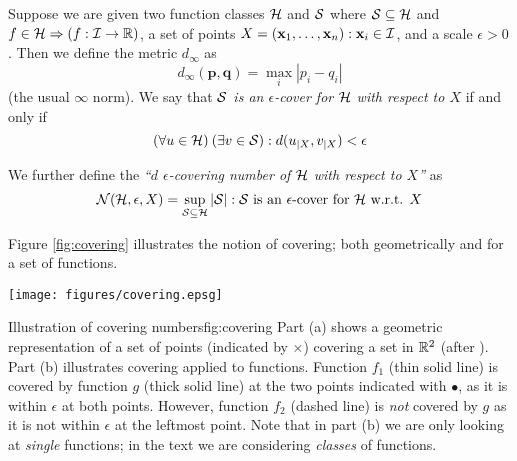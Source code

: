 \begin{definition}
\label{def:covering}
\label{def:covering numbers}
Suppose we are given two function classes $\mathcal{H}$ and $\mathcal{S}$ where $\mathcal{S}
\subseteq \mathcal{H}$ and $f \in \mathcal{H} \Rightarrow (f : \mathcal{I} \rightarrow
\mathbb{R})$, a set of points $X = (\mathbf{x}_1, \ldots, \mathbf{x}_n) : \mathbf{x}_i \in
\mathcal{I}$, and a scale $\epsilon > 0$.  Then we define the metric
$d_{\infty}$ as 
%
\begin{equation}
d_{\infty}(\mathbf{p}, \mathbf{q}) = \max_{i} |p_i - q_i|
\end{equation}
%
(the usual $\infty$ norm).  We say that \emph{$\mathcal{S}$ is an
$\epsilon$-cover for $\mathcal{H}$ with respect to $X$} if and only if 
%
\begin{equation}
(\forall u \in \mathcal{H})\:(\exists v \in \mathcal{S}) : d(u_{|X}, v_{|X}) < \epsilon
\end{equation}

We further define the \emph{``$d$ $\epsilon$-covering number of
$\mathcal{H}$ with respect to $X$''} as
% 
\begin{equation}
\mathcal{N}({\mathcal{H}}, {\epsilon}, {X}) = \sup_{\mathcal{S} \subseteq
\mathcal{H}}|\mathcal{S}| : \mbox{$\mathcal{S}$ is an $\epsilon$-cover for $\mathcal{H}$
w.r.t. $X$}
\end{equation}
\end{definition}

Figure \ref{fig:covering} illustrates the notion of covering; both
geometrically and for a set of functions.

\begin{linefigure}
\begin{center}
\texttt{[image: figures/covering.epsg]}
\end{center}
\begin{capt}{Illustration of covering numbers}{fig:covering}
Part (a) shows a geometric representation of a set of points
(indicated by $\times$) covering a set in $\mathbb{R}^2$ (after
\cite{Anthony98}).  Part (b) illustrates covering applied to
functions.  Function $f_1$ (thin solid line) is covered by function
$g$ (thick solid line) at the two points indicated with $\bullet$, as
it is within $\epsilon$ at both points. However, function $f_2$
(dashed line) is \emph{not} covered by $g$ as it is not within
$\epsilon$ at the leftmost point.  Note that in part (b) we are only
looking at \emph{single} functions; in the text we are considering
\emph{classes} of functions.
\end{capt}
\end{linefigure}


